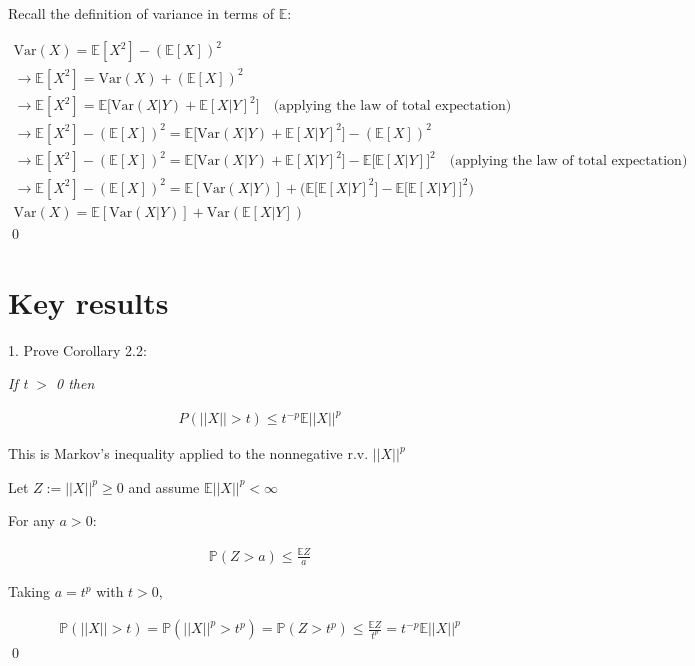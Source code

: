 \documentclass[10pt]{article}
\begin{document}
Recall the definition of variance in terms of $\mathbb{E}$:

\begin{gather*}
    \text{Var}(X) = \mathbb{E}[X^2] - (\mathbb{E}[X])^2 \\
    \to \mathbb{E}[X^2] = \text{Var}(X) + (\mathbb{E}[X])^2 \\
    \to \mathbb{E}[X^2] = \mathbb{E}\big[\text{Var}(X|Y) + \mathbb{E}[X|Y]^2\big] \quad\text{(applying the law of total expectation)} \\
    \to \mathbb{E}[X^2] - (\mathbb{E}[X])^2 = \mathbb{E}\big[\text{Var}(X|Y) + \mathbb{E}[X|Y]^2\big] - (\mathbb{E}[X])^2 \\ 
    \to \mathbb{E}[X^2] - (\mathbb{E}[X])^2 = \mathbb{E}\big[\text{Var}(X|Y) + \mathbb{E}[X|Y]^2\big] - \mathbb{E}\big[\mathbb{E}[X|Y]\big]^2\quad\text{(applying the law of total expectation)} \\
    \to \mathbb{E}[X^2] - (\mathbb{E}[X])^2 = \mathbb{E}[\text{Var}(X|Y)] + \Big(\mathbb{E}\big[\mathbb{E}[X|Y]^2\big] - \mathbb{E}\big[\mathbb{E}[X|Y]\big]^2\Big) \\
    \text{Var}(X) = \mathbb{E}[\text{Var}(X|Y)] + \text{Var}(\mathbb{E}[X|Y])
\end{gather*}
\qed

\newpage

\section{Key results}

1. Prove Corollary 2.2:

\textit{If t $>$ 0 then}

\begin{gather*}
    P(||X|| > t) \leq t^{-p}\mathbb{E}||X||^{p}
\end{gather*}

This is Markov's inequality applied to the nonnegative r.v. $||X||^{p}$

Let $Z:=||X||^{p} \geq 0$ and assume $\mathbb{E}||X||^{p} < \infty$

For any $a > 0$: 

\begin{gather*}
    \mathbb{P}(Z > a) \leq \frac{\mathbb{E}Z}{a}
\end{gather*}

Taking $a = t^{p}$ with $t > 0$,

\begin{gather*}
    \mathbb{P}(||X|| > t) = \mathbb{P}(||X||^{p} > t^{p}) = \mathbb{P}(Z > t^{p}) \leq \frac{\mathbb{E}Z}{t^{p}} = t^{-p}\mathbb{E}||X||^{p}
\end{gather*}
\qed
\end{document}
